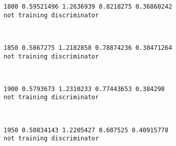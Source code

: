 \documentclass[11pt]{article}
\begin{document}
    \begin{Verbatim}[commandchars=\\\{\}]
1800 0.59521496 1.2636939 0.8218275 0.36860242
not training discriminator

    \end{Verbatim}

    \begin{center}
    \end{center}
    { \hspace*{\fill} \\}
    
    \begin{Verbatim}[commandchars=\\\{\}]
1850 0.5867275 1.2182858 0.78874236 0.38471264
not training discriminator

    \end{Verbatim}

    \begin{center}
    \end{center}
    { \hspace*{\fill} \\}
    
    \begin{Verbatim}[commandchars=\\\{\}]
1900 0.5793673 1.2310233 0.77443653 0.384298
not training discriminator

    \end{Verbatim}

    \begin{center}
    \end{center}
    { \hspace*{\fill} \\}
    
    \begin{Verbatim}[commandchars=\\\{\}]
1950 0.50834143 1.2205427 0.607525 0.40915778
not training discriminator

    \end{Verbatim}

    \begin{center}
    \end{center}
    { \hspace*{\fill} \\}
    
\end{document}
